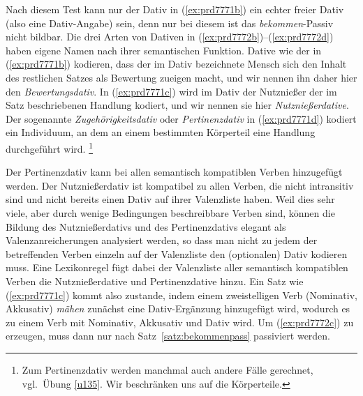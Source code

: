 \begin{exe}
  \ex\label{ex:prd7772} 
  \begin{xlist}
  \end{xlist}
\end{exe}


Nach diesem Test kann nur der Dativ in (\ref{ex:prd7771b}) ein echter freier Dativ (also eine Dativ-Angabe) sein, denn nur bei diesem ist das \textit{bekommen}-Passiv nicht bildbar.
Die drei Arten von Dativen in (\ref{ex:prd7772b})--(\ref{ex:prd7772d}) haben eigene Namen nach ihrer semantischen Funktion.
Dative wie der in (\ref{ex:prd7771b}) kodieren, dass der im Dativ bezeichnete Mensch sich den Inhalt des restlichen Satzes als Bewertung zueigen macht, und wir nennen ihn daher hier den \textit{Bewertungsdativ}.
In (\ref{ex:prd7771c}) wird im Dativ der Nutznießer der im Satz beschriebenen Handlung kodiert, und wir nennen sie hier \textit{Nutznießerdative}.
Der sogenannte \textit{Zugehörigkeitsdativ} oder \textit{Pertinenzdativ} in (\ref{ex:prd7771d}) kodiert ein Individuum, an dem an einem bestimmten Körperteil eine Handlung durchgeführt wird.%
\footnote{Zum Pertinenzdativ werden manchmal auch andere Fälle gerechnet, vgl.\ Übung \ref{u135}.
Wir beschränken uns auf die Körperteile.}


Der Pertinenzdativ kann bei allen semantisch kompatiblen Verben hinzugefügt werden.
Der Nutznießerdativ ist kompatibel zu allen Verben, die nicht intransitiv sind und nicht bereits einen Dativ auf ihrer Valenzliste haben.
Weil dies sehr viele, aber durch wenige Bedingungen beschreibbare Verben sind, können die Bildung des Nutznießerdativs und des Pertinenzdativs elegant als Valenzanreicherungen analysiert werden, so dass man nicht zu jedem der betreffenden Verben einzeln auf der Valenzliste den (optionalen) Dativ kodieren muss.
Eine Lexikonregel fügt dabei der Valenzliste aller semantisch kompatiblen Verben die Nutznießerdative und Pertinenzdative hinzu.
Ein Satz wie (\ref{ex:prd7771c}) kommt also zustande, indem einem zweistelligen Verb (Nominativ, Akkusativ) \textit{mähen} zunächst eine Dativ-Ergänzung hinzugefügt wird, wodurch es zu einem Verb mit Nominativ,  Akkusativ und Dativ wird.
Um (\ref{ex:prd7772c}) zu erzeugen, muss dann nur nach Satz~\ref{satz:bekommenpass} passiviert werden.

